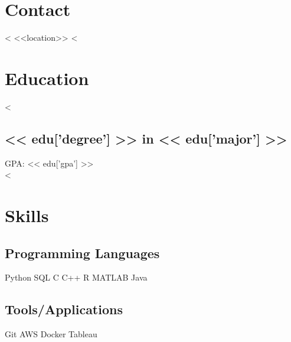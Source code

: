 \documentclass[letterpaper]{deedy-resume}
\begin{document}
\hfill
%
%
\begin{minipage}[t]{0.24\textwidth} 
\section{Contact} 
<%
<<location>>
<%


\section{Education} 
<%
\sectionspace 
\subsection{<< edu['degree'] >> in << edu['major'] >>} 
GPA: << edu['gpa'] >>\\
<%




\section{Skills}

\subsection{Programming Languages}

Python  \textbullet{} SQL \textbullet{} C \textbullet{} C++  \textbullet{} R \textbullet{} MATLAB  \textbullet{} Java  

\sectionspace

\subsection{Tools/Applications}
Git \textbullet{} AWS \textbullet{} Docker  \textbullet{} Tableau  
\sectionspace

\end{minipage}
\end{document}
